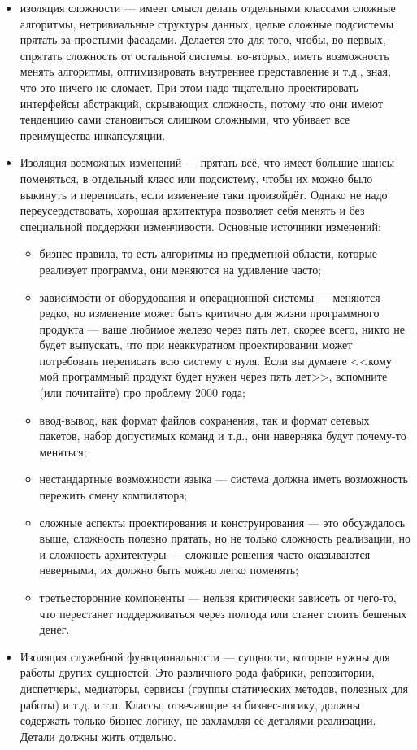 \documentclass{../../text-style}
\begin{document}
\begin{itemize}
    \item изоляция сложности --- имеет смысл делать отдельными классами сложные алгоритмы, нетривиальные структуры данных, целые сложные подсистемы прятать за простыми фасадами. Делается это для того, чтобы, во-первых, спрятать сложность от остальной системы, во-вторых, иметь возможность менять алгоритмы, оптимизировать внутреннее представление и т.д., зная, что это ничего не сломает. При этом надо тщательно проектировать интерфейсы абстракций, скрывающих сложность, потому что они имеют тенденцию сами становиться слишком сложными, что убивает все преимущества инкапсуляции.
    \item Изоляция возможных изменений --- прятать всё, что имеет большие шансы поменяться, в отдельный класс или подсистему, чтобы их можно было выкинуть и переписать, если изменение таки произойдёт. Однако не надо переусердствовать, хорошая архитектура позволяет себя менять и без специальной поддержки изменчивости. Основные источники изменений:
    \begin{itemize}
        \item бизнес-правила, то есть алгоритмы из предметной области, которые реализует программа, они меняются на удивление часто;
        \item зависимости от оборудования и операционной системы --- меняются редко, но изменение может быть критично для жизни программного продукта --- ваше любимое железо через пять лет, скорее всего, никто не будет выпускать, что при неаккуратном проектировании может потребовать переписать всю систему с нуля. Если вы думаете <<кому мой программный продукт будет нужен через пять лет>>, вспомните (или почитайте) про проблему 2000 года;
        \item ввод-вывод, как формат файлов сохранения, так и формат сетевых пакетов, набор допустимых команд и т.д., они наверняка будут почему-то меняться;
        \item нестандартные возможности языка --- система должна иметь возможность пережить смену компилятора;
        \item сложные аспекты проектирования и конструирования --- это обсуждалось выше, сложность полезно прятать, но не только сложность реализации, но и сложность архитектуры --- сложные решения часто оказываются неверными, их должно быть можно легко поменять;
        \item третьесторонние компоненты --- нельзя критически зависеть от чего-то, что перестанет поддерживаться через полгода или станет стоить бешеных денег.
    \end{itemize}
    \item Изоляция служебной функциональности --- сущности, которые нужны для работы других сущностей. Это различного рода фабрики, репозитории, диспетчеры, медиаторы, сервисы (группы статических методов, полезных для работы) и т.д. и т.п. Классы, отвечающие за бизнес-логику, должны содержать только бизнес-логику, не захламляя её деталями реализации. Детали должны жить отдельно.
\end{itemize}
\end{document}
